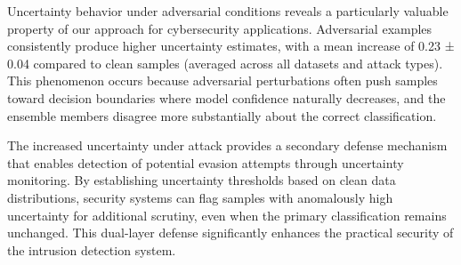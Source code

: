 \documentclass[journal]{IEEEtran}
\begin{document}
Uncertainty behavior under adversarial conditions reveals a particularly valuable property of our approach for cybersecurity applications. Adversarial examples consistently produce higher uncertainty estimates, with a mean increase of 0.23 ± 0.04 compared to clean samples (averaged across all datasets and attack types). This phenomenon occurs because adversarial perturbations often push samples toward decision boundaries where model confidence naturally decreases, and the ensemble members disagree more substantially about the correct classification.

The increased uncertainty under attack provides a secondary defense mechanism that enables detection of potential evasion attempts through uncertainty monitoring. By establishing uncertainty thresholds based on clean data distributions, security systems can flag samples with anomalously high uncertainty for additional scrutiny, even when the primary classification remains unchanged. This dual-layer defense significantly enhances the practical security of the intrusion detection system.
\end{document}
